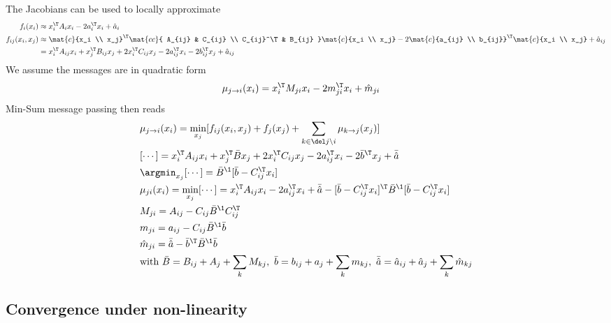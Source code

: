 The Jacobians can be used to locally approximate
\begin{align}
f_i(x_i)
 &\approx x_i^\T A_i x_i - 2 a_i^\T x_i + \hat a_i \\
f_{ij}(x_i,x_j)
 &\approx\mat{c}{x_i \\ x_j}^\T
   \mat{cc}{ A_{ij} & C_{ij} \\ C_{ij}^\T & B_{ij} }
   \mat{c}{x_i \\ x_j}
 - 2 \mat{c}{a_{ij} \\ b_{ij}}^\T \mat{c}{x_i \\ x_j}
 + \hat a_{ij} \\
 &= x_i^\T A_{ij} x_i + x_j^\T B_{ij} x_j + 2 x_i^\T C_{ij} x_j  - 2
 a_{ij}^\T x_i -2 b_{ij}^\T x_j + \hat a_{ij}
\end{align}
We assume the messages are in quadratic form
\begin{align}
&\mu_{j\to i}(x_i)
 = x_i^\T M_{ji} x_i - 2 m_{ji}^\T x_i + \hat m_{ji}
\end{align}
%
\newcommand{\+}{\myplus}
\renewcommand{\-}{\myminus}
%
Min-Sum message passing then reads
\begin{align}
&\mu_{j\to i}(x_i)
 = \min_{x_j} [f_{ij}(x_i,x_j) + f_j(x_j) + \sum_{k\in\del j\setminus
 i} \mu_{k\to j}(x_j)] \\
&[\cdots]
 = x_i^\T A_{ij} x_i + x_j^\T \bar B x_j + 2 x_i^\T C_{ij} x_j
  - 2 a_{ij}^\T x_i - 2 \bar b^\T x_j + \bar{\hat a} \\
&\argmin_{x_j}[\cdots]
 = \bar B^\1 [\bar b - C_{ij}^\T x_i] \\
&\mu_{ji}(x_i) = \min_{x_j}[\cdots]
 = x_i^\T A_{ij} x_i - 2 a_{ij}^\T x_i + \bar{\hat a}
  -[\bar b - C_{ij}^\T x_i]^\T \bar B^\1 [\bar b - C_{ij}^\T x_i] \\
& M_{ji} = A_{ij} - C_{ij} \bar B^\1 C_{ij}^\T \\
& m_{ji} = a_{ij} - C_{ij} \bar B^\1 \bar b \\
& \hat m_{ji} = \bar{\hat a} - \bar b^\T \bar B^\1 \bar b\\
& \text{with } \bar B = B_{ij} + A_j + \sum_k M_{kj},~ \bar b=b_{ij} +
a_j + \sum_k m_{kj},~ \bar{\hat a}=\hat a_{ij} + \hat a_j + \sum_k \hat m_{kj}
\end{align}


\subsection{Convergence under non-linearity}

